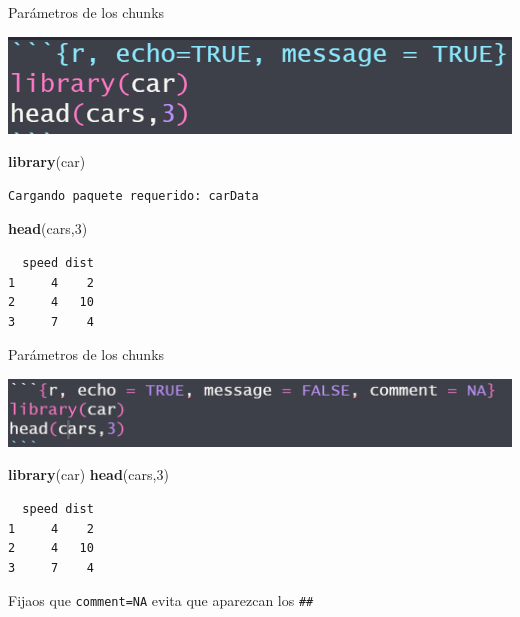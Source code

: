 \documentclass[
  ignorenonframetext,
  aspectratio=169]{beamer}
\newenvironment{Shaded}{\begin{snugshade}}{\end{snugshade}}
\newcommand{\DecValTok}[1]{\textcolor[rgb]{0.00,0.00,0.81}{#1}}
\newcommand{\FunctionTok}[1]{\textcolor[rgb]{0.13,0.29,0.53}{\textbf{#1}}}
\newcommand{\NormalTok}[1]{#1}
\begin{document}
\begin{frame}[fragile]{Parámetros de los chunks}
\label{paruxe1metros-de-los-chunks-4}
\begin{center}\includegraphics[width=0.3\linewidth]{Imgs/parametros_chunk_2} \end{center}

\begin{Shaded}
\begin{Highlighting}[]
\FunctionTok{library}\NormalTok{(car)}
\end{Highlighting}
\end{Shaded}

\begin{verbatim}
Cargando paquete requerido: carData
\end{verbatim}

\begin{Shaded}
\begin{Highlighting}[]
\FunctionTok{head}\NormalTok{(cars,}\DecValTok{3}\NormalTok{)}
\end{Highlighting}
\end{Shaded}

\begin{verbatim}
  speed dist
1     4    2
2     4   10
3     7    4
\end{verbatim}
\end{frame}

\begin{frame}[fragile]{Parámetros de los chunks}
\label{paruxe1metros-de-los-chunks-5}
\begin{center}\includegraphics[width=0.3\linewidth]{Imgs/para_chunks_3} \end{center}

\begin{Shaded}
\begin{Highlighting}[]
\FunctionTok{library}\NormalTok{(car)}
\FunctionTok{head}\NormalTok{(cars,}\DecValTok{3}\NormalTok{)}
\end{Highlighting}
\end{Shaded}

\begin{verbatim}
  speed dist
1     4    2
2     4   10
3     7    4
\end{verbatim}

Fijaos que \texttt{comment=NA} evita que aparezcan los \texttt{\#\#}
\end{frame}
\end{document}
